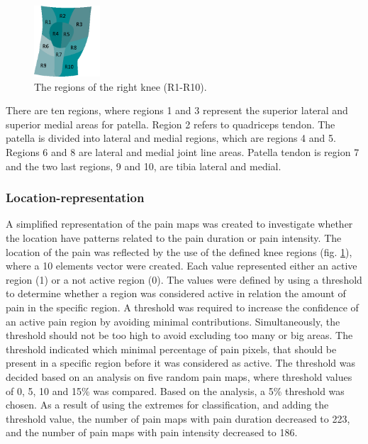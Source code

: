 \begin{figure} [H] 
\centering
\includegraphics[width=0.22\textwidth]{Figures/atlas}
\caption{The regions of the right knee (R1-R10).}
\label{fig:atlas}
\end{figure}

\noindent 
There are ten regions, where regions 1 and 3 represent the superior lateral and superior medial areas for patella. Region 2 refers to quadriceps tendon. The patella is divided into lateral and medial regions, which are regions 4 and 5. Regions 6 and 8 are lateral and medial joint line areas. Patella tendon is region 7 and the two last regions, 9 and 10, are tibia lateral and medial.\citep{Elson2010}

\subsubsection*{\textbf{Location-representation}} 
A simplified representation of the pain maps was created to investigate whether the location have patterns related to the pain duration or pain intensity. The location of the pain was reflected by the use of the defined knee regions (fig. \ref{fig:atlas}), where a 10 elements vector were created. Each value represented either an active region (1) or a not active region (0). The values were defined by using a threshold to determine whether a region was considered active in relation the amount of pain in the specific region. A threshold was required to increase the confidence of an active pain region by avoiding minimal contributions. Simultaneously, the threshold should not be too high to avoid excluding too many or big areas. The threshold indicated which minimal percentage of pain pixels, that should be present in a specific region before it was considered as active. The threshold was decided based on an analysis on five random pain maps, where threshold values of 0, 5, 10 and 15\% was compared. Based on the analysis, a 5\% threshold was chosen. As a result of using the extremes for classification, and adding the threshold value, the number of pain maps with pain duration decreased to 223, and the number of pain maps with pain intensity decreased to 186.  

